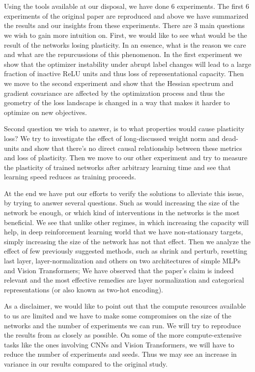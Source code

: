 \section{}
\label{sec:results}

Using the tools available at our disposal, we have done 6 experiments. The first 6 experiments of the original paper are reproduced and above we have summarized the results and our insights from these experiments.
There are 3 main questions we wish to gain more intuition on.
First, we would like to see what would be the result of the networks losing plasticity. In an essence, what is the reason we care and what are the repurcussions of this phenomenon. In the first experiment we show that the optimizer instability under abrupt label changes will lead to a large fraction of inactive ReLU units and thus loss of representational capacity. Then we move to the second experiment and show that the Hessian spectrum and gradient covariance are affected by the optimization process and thus the geometry of the loss landscape is changed in a way that makes it harder to optimize on new objectives.

Second question we wish to answer, is to what properties would cause plasticity loss? We try to investigate the effect of long-discussed weight norm and dead-units and show that there's no direct causal relationship between these metrics and loss of plasticity. Then we move to our other experiment and try to measure the plasticity of trained networks after arbitrary learning time and see that learning speed reduces as training proceeds.

At the end we have put our efforts to verify the solutions to alleviate this issue, by trying to answer several questions. Such as would increasing the size of the network be enough, or which kind of interventions in the networks is the most beneficial. We see that unlike other regimes, in which increasing the capacity will help, in deep reinforcement learning world that we have non-stationary targets, simply increasing the size of the network has not that effect. Then we analyze the effect of few previously suggested methods, such as shrink and perturb, resetting last layer, layer-normalization and others on two architectures of simple MLPs and Vision Transformers; We have observed that the paper's claim is indeed relevant and the most effective remedies are layer normalization and categorical representations (or also known as two-hot encoding).

As a disclaimer, we would like to point out that the compute resources available to us are limited and we have to make some compromises on the size of the networks and the number of experiments we can run. We will try to reproduce the results from \citep{lyle2023understanding} as closely as possible. On some of the more compute-extensive tasks like the ones involving CNNs and Vision Transformers, we will have to reduce the number of experiments and seeds. Thus we may see an increase in variance in our results compared to the original study.


